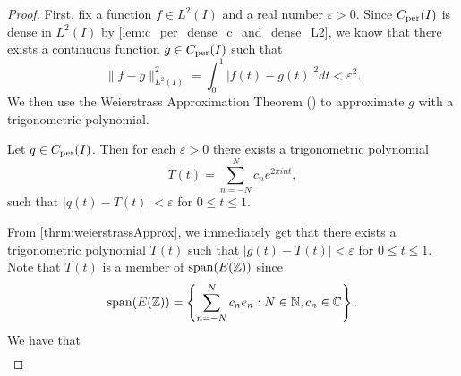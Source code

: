 \documentclass[../thesis.tex]{subfiles}
\begin{document}
\begin{proof}
    First, fix a function $f\in L^2(I)$ and a real number $\varepsilon >0$. Since $C_{\text{per}}(I)$ is dense in $L^2(I)$ by \cref{lem:c_per_dense_c_and_dense_L2}, we know that there exists a continuous function $g \in C_{\text{per}}(I)$ such that
    \begin{equation}\label{eq:estimate_1}
        \| f-g \|_{L^2(I)}^2 = \int_0^1 \left|f(t)-g(t) \right|^2dt < \varepsilon^2.
    \end{equation}
    We then use the Weierstrass Approximation Theorem (\cite[p.~202]{durenInvitationClassicalAnalysis2012}) to approximate $g$ with a trigonometric polynomial. 
    \begin{theorem}\label{thrm:weierstrassApprox}
        Let $q\in C_{\text{per}} (I)$. Then for each $\varepsilon>0$ there exists a trigonometric polynomial %
        \begin{equation*}
            T(t) = \sum_{n=-N}^N c_n e^{2\pi i n t},
        \end{equation*}
        such that $|q(t)-T(t)|<\varepsilon$ for $0 \leq t \leq 1$.
    \end{theorem}
    From \cref{thrm:weierstrassApprox}, we immediately get that there exists a trigonometric polynomial $T(t)$ such that $|g(t)-T(t)|<\varepsilon$ for $0 \leq t \leq 1$. Note that $T(t)$ is a member of $\operatorname{span}(E(\mathbb{Z}))$ since %
    \begin{equation*}
        \operatorname{span}(E(\mathbb{Z}))=\left\{\sum_{n=-N}^N c_n e_n : N \in \mathbb{N}, c_n \in \mathbb{C}\right\}.
    \end{equation*}
    We have that
    \begin{align}\label{eq:estimate_2}

\end{align}
\end{proof}
\end{document}
